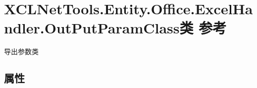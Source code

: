 \hypertarget{class_x_c_l_net_tools_1_1_entity_1_1_office_1_1_excel_handler_1_1_out_put_param_class}{}\section{X\+C\+L\+Net\+Tools.\+Entity.\+Office.\+Excel\+Handler.\+Out\+Put\+Param\+Class类 参考}
\label{class_x_c_l_net_tools_1_1_entity_1_1_office_1_1_excel_handler_1_1_out_put_param_class}


导出参数类  


\subsection*{属性}

